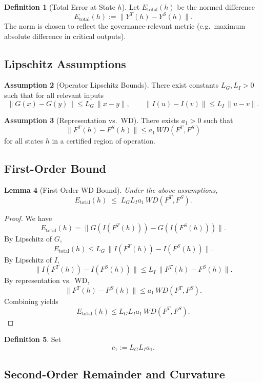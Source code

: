 \documentclass[11pt]{article}
\theoremstyle{definition}
\newtheorem{defn}{Definition}[section]
\newtheorem{assump}[defn]{Assumption}
\theoremstyle{plain}
\newtheorem{lem}[defn]{Lemma}
\theoremstyle{remark}
\begin{document}
\begin{defn}[Total Error at State \(h\)]
Let \(E_{\text{total}}(h)\) be the normed difference
\[
  E_{\text{total}}(h) := \big\| Y^T(h) - Y^S(h) \big\|.
\]
The norm is chosen to reflect the governance-relevant metric (e.g.\ maximum absolute difference in critical outputs).
\end{defn}

\subsection{Lipschitz Assumptions}

\begin{assump}[Operator Lipschitz Bounds]
There exist constants \(L_G,L_I>0\) such that for all relevant inputs
\[
  \|G(x) - G(y)\| \le L_G \, \|x-y\|,
  \qquad
  \|I(u) - I(v)\| \le L_I \, \|u-v\|.
\]
\end{assump}

\begin{assump}[Representation vs.\ WD]
There exists \(a_1>0\) such that
\[
  \|F^T(h) - F^S(h)\| \le a_1 \, WD(F^T,F^S)
\]
for all states \(h\) in a certified region of operation.
\end{assump}

\subsection{First-Order Bound}

\begin{lem}[First-Order WD Bound]
Under the above assumptions,
\[
  E_{\text{total}}(h)
  \;\le\;
  L_G L_I a_1 \, WD(F^T,F^S).
\]
\end{lem}

\begin{proof}
We have
\[
  E_{\text{total}}(h) = \| G(I(F^T(h))) - G(I(F^S(h))) \|.
\]
By Lipschitz of \(G\),
\[
  E_{\text{total}}(h)
  \le L_G \, \| I(F^T(h)) - I(F^S(h)) \|.
\]
By Lipschitz of \(I\),
\[
  \| I(F^T(h)) - I(F^S(h)) \|
  \le L_I \, \|F^T(h) - F^S(h)\|.
\]
By representation vs.\ WD,
\[
  \|F^T(h) - F^S(h)\|
  \le a_1 \, WD(F^T,F^S).
\]
Combining yields
\[
  E_{\text{total}}(h)
  \le L_G L_I a_1 \, WD(F^T,F^S).
\]
\end{proof}

\begin{defn}
Set 
\[
  c_1 := L_G L_I a_1.
\]
\end{defn}

\subsection{Second-Order Remainder and Curvature}
\end{document}
